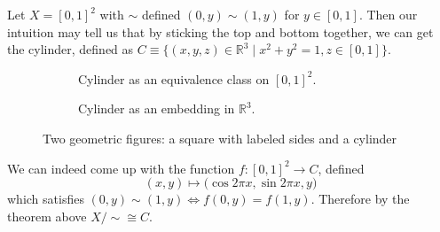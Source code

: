     \begin{example}[Cylinder]
      Let $X = [0, 1]^2$ with $\sim$ defined $(0, y) \sim (1, y)$ for $y \in [0, 1]$. Then our intuition may tell us that by sticking the top and bottom together, we can get the cylinder, defined as $C \equiv \{(x, y, z) \in \mathbb{R}^3 \mid x^2 + y^2 = 1, z \in [0,1]\}$.

      \begin{figure}[H]
        \centering
        \begin{subfigure}[b]{0.48\textwidth}
          \centering
          \caption{Cylinder as an equivalence class on $[0, 1]^2$.}
          \label{fig:cylinder_equiv}
        \end{subfigure}
        \hfill 
        \begin{subfigure}[b]{0.48\textwidth}
          \centering
          \caption{Cylinder as an embedding in $\mathbb{R}^3$. }
          \label{fig:cylinder_embed}
        \end{subfigure}
        \caption{Two geometric figures: a square with labeled sides and a cylinder}
        \label{fig:cylinder}
      \end{figure}
      
      We can indeed come up with the function $f: [0, 1]^2 \rightarrow C$, defined
      \begin{equation}
        (x, y) \mapsto \big( \cos{2\pi x}, \sin{2 \pi x}, y \big)
      \end{equation}
      which satisfies $(0, y) \sim (1, y) \iff f(0, y) = f(1, y)$. Therefore by the theorem above $X/{\sim} \cong C$. 
    \end{example}

